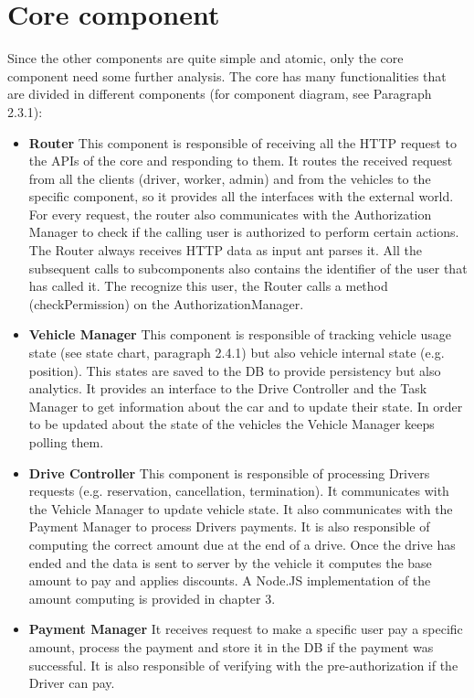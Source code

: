 \section {Core component}
Since the other components are quite simple and atomic, only the core component need some further analysis. The core has many functionalities that are divided in different components (for component diagram, see Paragraph 2.3.1):
\begin{itemize}
\item \textbf{Router} This component is responsible of receiving all the HTTP request to the APIs of the core and responding to them. It routes the received request from all the clients (driver, worker, admin) and from the vehicles to the specific component, so it provides all the interfaces with the external world. For every request, the router also communicates with the Authorization Manager to check if the calling user is authorized to perform certain actions. The Router always receives HTTP data as input ant parses it. All the subsequent calls to subcomponents also contains the identifier of the user that has called it. The recognize this user, the Router calls a method (checkPermission) on the AuthorizationManager.
\item \textbf{Vehicle Manager} This component is responsible of tracking vehicle usage state (see state chart, paragraph 2.4.1) but also vehicle internal state (e.g. position). This states are saved to the DB to provide persistency but also analytics. It provides an interface to the Drive Controller and the Task Manager to get information about the car and to update their state. In order to be updated about the state of the vehicles the Vehicle Manager keeps polling them.
\item \textbf{Drive Controller} This component is responsible of processing Drivers requests (e.g. reservation, cancellation, termination). It communicates with the Vehicle Manager to update vehicle state. It also communicates with the Payment Manager to process Drivers payments. It is also responsible of computing the correct amount due at the end of a drive. Once the drive has ended and the data is sent to server by the vehicle it computes the base amount to pay and applies discounts. A Node.JS implementation of the amount computing is provided in chapter 3.
\item \textbf{Payment Manager} It receives request to make a specific user pay a specific amount, process the payment and store it in the DB if the payment was successful. It is also responsible of verifying with the pre-authorization if the Driver can pay. 

\end{itemize}
